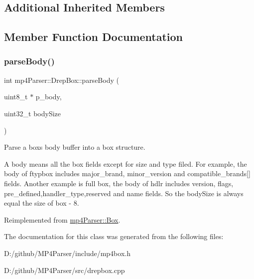 \subsection*{Additional Inherited Members}


\subsection{Member Function Documentation}
\mbox{\label{classmp4_parser_1_1_drep_box_a5285192d3fbb13b91493942f05c04ca8}} 
\subsubsection{\texorpdfstring{parseBody()}{parseBody()}}
{\footnotesize\ttfamily int mp4\+Parser\+::\+Drep\+Box\+::parse\+Body (\begin{DoxyParamCaption}\item[{uint8\+\_\+t $\ast$}]{p\+\_\+body,  }\item[{uint32\+\_\+t}]{body\+Size }\end{DoxyParamCaption})\hspace{0.3cm}{\ttfamily [virtual]}}



Parse a box\textquotesingle{}s body buffer into a box structure. 

A body means all the box fields except for size and type filed. For example, the body of ftypbox includes major\+\_\+brand, minor\+\_\+version and compatible\+\_\+brands\mbox{[}\mbox{]} fields. Another example is full box, the body of hdlr includes version, flags, pre\+\_\+defined,handler\+\_\+type,reserved and name fields. So the body\+Size is always equal the size of box -\/ 8. 

Reimplemented from \mbox{\hyperlink{classmp4_parser_1_1_box_a3dd0c084ac65bc77b69ac5ecaf796cb2}{mp4\+Parser\+::\+Box}}.



The documentation for this class was generated from the following files\+:\begin{DoxyCompactItemize}
\item 
D\+:/github/\+M\+P4\+Parser/include/mp4box.\+h\item 
D\+:/github/\+M\+P4\+Parser/src/drepbox.\+cpp\end{DoxyCompactItemize}
